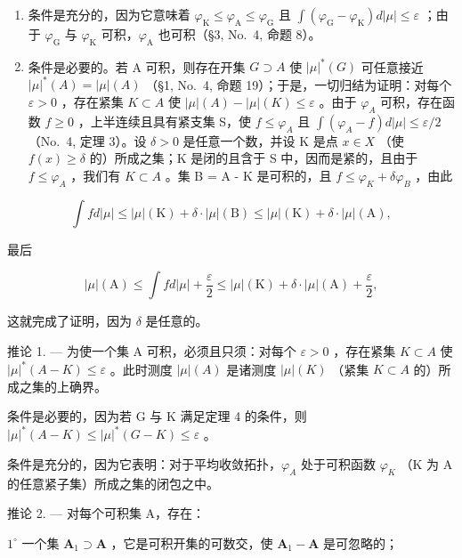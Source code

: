 \begin{enumerate}
\def\labelenumi{\alph{enumi})}
\item
  条件是充分的，因为它意味着 \(\varphi_{\mathrm{K}} \leqslant \varphi_{\mathrm{A}} \leqslant \varphi_{\mathrm{G}}\) 且 \(\int (\varphi_{\mathrm{G}} - \varphi_{\mathrm{K}}) d|\mu| \leqslant \varepsilon\) ；由于 \(\varphi_{\mathrm{G}}\) 与 \(\varphi_{\mathrm{K}}\) 可积，\(\varphi_{\mathrm{A}}\) 也可积（§3, No.~4, 命题 8）。
\item
  条件是必要的。若 A 可积，则存在开集 \(G \supset A\) 使 \(|\mu|^{*}(G)\) 可任意接近 \(|\mu|^{*}(A) = |\mu|(A)\) （§1, No.~4, 命题 19）；于是，一切归结为证明：对每个 \(\varepsilon > 0\) ，存在紧集 \(K \subset A\) 使 \(|\mu|(A) - |\mu|(K) \leqslant \varepsilon\) 。由于 \(\varphi_{A}\) 可积，存在函数 \(f \geqslant 0\) ，上半连续且具有紧支集 S，使 \(f \leqslant \varphi_{A}\) 且 \(\int(\varphi_{A} - f)d|\mu| \leqslant \varepsilon/2\) （No.~4, 定理 3）。设 \(\delta > 0\) 是任意一个数，并设 K 是点 \(x \in X\) （使 \(f(x) \geqslant \delta\) 的）所成之集；K 是闭的且含于 S 中，因而是紧的，且由于 \(f \leqslant \varphi_{A}\) ，我们有 \(K \subset A\) 。集 B = A - K 是可积的，且 \(f \leqslant \varphi_{K} + \delta\varphi_{B}\) ，由此
\end{enumerate}

\[
\int f d | \mu | \leqslant | \mu | (\mathrm{K}) + \delta \cdot | \mu | (\mathrm{B}) \leqslant | \mu | (\mathrm{K}) + \delta \cdot | \mu | (\mathrm{A}),
\]

最后

\[
| \mu | (\mathrm{A}) \leqslant \int f d | \mu | + \frac {\varepsilon}{2} \leqslant | \mu | (\mathrm{K}) + \delta \cdot | \mu | (\mathrm{A}) + \frac {\varepsilon}{2},
\]

这就完成了证明，因为 \(\delta\) 是任意的。

推论 1. --- 为使一个集 A 可积，必须且只须：对每个 \(\varepsilon > 0\) ，存在紧集 \(K \subset A\) 使 \(|\mu|^*(A - K) \leqslant \varepsilon\) 。此时测度 \(|\mu|(A)\) 是诸测度 \(|\mu|(K)\) （紧集 \(K \subset A\) 的）所成之集的上确界。

条件是必要的，因为若 G 与 K 满足定理 4 的条件，则 \(|\mu|^{*}(A - K) \leqslant |\mu|^{*}(G - K) \leqslant \varepsilon\) 。

条件是充分的，因为它表明：对于平均收敛拓扑，\(\varphi_{A}\) 处于可积函数 \(\varphi_{K}\) （K 为 A 的任意紧子集）所成之集的闭包之中。

推论 2. --- 对每个可积集 A，存在：

\(1^{\circ}\) 一个集 \(\mathbf{A}_1\supset \mathbf{A}\) ，它是可积开集的可数交，使 \(\mathbf{A}_1 - \mathbf{A}\) 是可忽略的；

